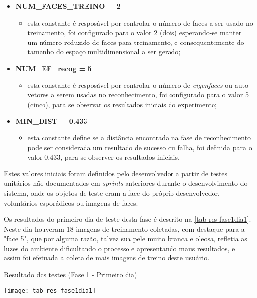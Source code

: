 \begin{itemize}	
	\item \textbf{NUM\_FACES\_TREINO = 2}
	\begin{itemize}	
		\item esta constante é resposável por controlar o número de faces a ser usado no treinamento, foi configurado para o valor 2 (dois) esperando-se manter um número reduzido de faces para treinamento, e consequentemente do tamanho do espaço multidimensional a ser gerado;
	\end{itemize}

	\item \textbf{NUM\_EF\_recog = 5}
	\begin{itemize}	
		\item esta constante é resposável por controlar o número de \textit{eigenfaces} ou auto-vetores a serem usadas no reconhecimento, foi configurado para o valor 5 (cinco), para se observar os resultados iniciais do experimento;
	\end{itemize}

	\item \textbf{MIN\_DIST = 0.433}
	\begin{itemize}	
		\item esta constante define se a distância encontrada na fase de reconhecimento pode ser considerada um resultado de sucesso ou falha, foi definida para o valor 0.433, para se observer os resultados iniciais.
	\end{itemize}
\end{itemize}

Estes valores iniciais foram definidos pelo desenvolvedor a partir de testes unitários não documentados em \textit{sprints} anteriores durante o desenvolvimento do sistema, onde os objetos de teste eram a face do próprio desenvolvedor, voluntários esporádicos ou imagens de faces.

Os resultados do primeiro dia de teste desta fase é descrito na \autoref{tab-res-fase1dia1}. Neste dia houveram 18 imagens de treinamento coletadas, com destaque para a "face 5", que por alguma razão, talvez sua pele muito branca e oleosa, refletia as luzes do ambiente dificultando o processo e apresentando maus resultados, e assim foi efetuada a coleta de mais imagens de treino deste usuário.

\begin{table}[h]
	\centering
	\caption{Resultado dos testes (Fase 1 - Primeiro dia) }
	\texttt{[image: tab-res-fase1dia1]}
	\label{tab-res-fase1dia1}
\end{table}

